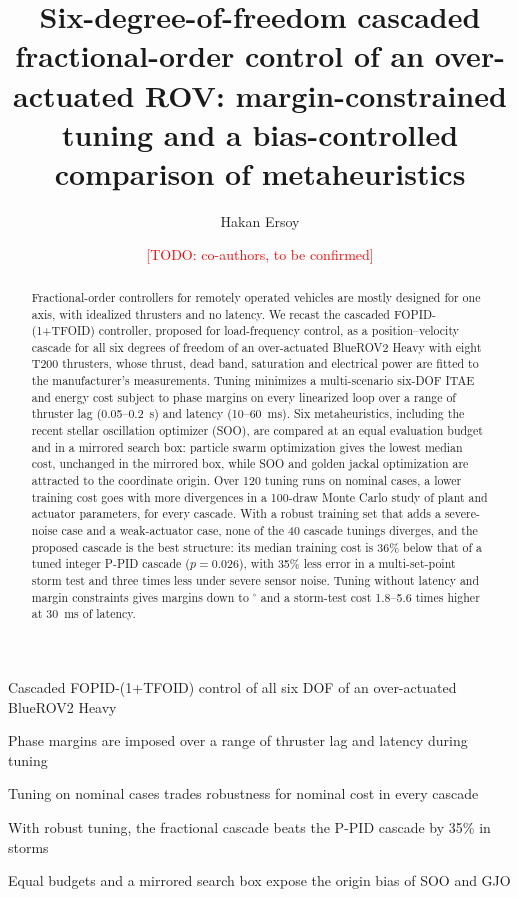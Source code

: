 \documentclass[review,12pt]{elsarticle}
\newcommand{\todo}[1]{\textcolor{red}{[TODO: #1]}}
\begin{document}
\begin{frontmatter}

\title{Six-degree-of-freedom cascaded fractional-order control of an over-actuated ROV: margin-constrained tuning and a bias-controlled comparison of metaheuristics}

\author[1]{Hakan Ersoy}
\author[1]{\todo{co-authors, to be confirmed}}

\begin{abstract}
Fractional-order controllers for remotely operated vehicles are mostly designed for one axis, with idealized
thrusters and no latency. We recast the cascaded FOPID-(1+TFOID) controller, proposed for load-frequency
control, as a position--velocity cascade for all six degrees of freedom of an over-actuated BlueROV2 Heavy with
eight T200 thrusters, whose thrust, dead band, saturation and electrical power are fitted to the manufacturer's
measurements. Tuning minimizes a multi-scenario six-DOF ITAE and energy cost subject to phase margins on every
linearized loop over a range of thruster lag (0.05--0.2~s) and latency (10--60~ms). Six metaheuristics,
including the recent stellar oscillation optimizer (SOO), are compared at an equal evaluation budget and in a
mirrored search box: particle swarm optimization gives the lowest median cost, unchanged in the mirrored box,
while SOO and golden jackal optimization are attracted to the coordinate origin. Over 120 tuning runs on nominal
cases, a lower training cost goes with more divergences in a 100-draw Monte Carlo study of plant and actuator
parameters, for every cascade. With a robust training set that adds a severe-noise case and a weak-actuator
case, none of the 40 cascade tunings diverges, and the proposed cascade is the best structure: its median
training cost is 36\% below that of a tuned integer P-PID cascade ($p=0.026$), with 35\% less error in a
multi-set-point storm test and three times less under severe sensor noise. Tuning without latency and margin
constraints gives margins down to \pmUncMin$^\circ$ and a storm-test cost 1.8--5.6 times higher at 30~ms of
latency.
\end{abstract}

\begin{highlights}
\item Cascaded FOPID-(1+TFOID) control of all six DOF of an over-actuated BlueROV2 Heavy
\item Phase margins are imposed over a range of thruster lag and latency during tuning
\item Tuning on nominal cases trades robustness for nominal cost in every cascade
\item With robust tuning, the fractional cascade beats the P-PID cascade by 35\% in storms
\item Equal budgets and a mirrored search box expose the origin bias of SOO and GJO
\end{highlights}


\end{frontmatter}
\end{document}
